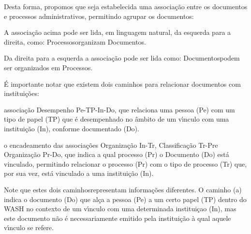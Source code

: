 \documentclass[
12pt,		%
openright,	%
twoside,  %
a4paper,			%
chapter=TITLE,		%
english,			%
french,				%
spanish,			%
brazil				%
]{USPSC-classe/USPSC}
\begin{document}
Desta forma, propomos que seja estabelecida uma associa\c{c}\~ao entre os documentos e processos administrativos, permitindo agrupar os documentos:






A associa\c{c}\~ao acima pode ser lida, em linguagem natural, da esquerda para a direita, como: \textquotedbl Processos\textquotedbl  organizam \textquotedbl Documentos\textquotedbl .




Da direita para a esquerda a associa\c{c}\~ao pode ser lida como: \textquotedbl Documentos\textquotedbl  podem ser organizados em \textquotedbl Processos\textquotedbl .




\'E importante notar que existem dois caminhos para relacionar documentos com institui\c{c}\~oes:





\begin{alineas}
\item associa\c{c}\~ao \textquotedbl Desempenho Pe-TP-In-Do\textquotedbl , que relaciona uma pessoa (Pe) com um tipo de papel (TP) que \'e desempenhado no \^ambito de um v\'{\i}nculo com uma institui\c{c}\~ao (In), conforme documentado 
(Do).
\item o encadeamento das associa\c{c}\~oes \textquotedbl Organiza\c{c}\~ao In-Tr\textquotedbl , \textquotedbl Classifica\c{c}\~ao Tr-Pr\textquotedbl  e \textquotedbl Organiza\c{c}\~ao Pr-Do\textquotedbl , que indica a qual processo (Pr) o Documento (Do) est\'a vinculado, permitindo relacionar o processo (Pr) com o tipo de processo (Tr) que, por sua vez, est\'a vinculado a uma institui\c{c}\~ao (In).
\end{alineas}

Note que estes dois \textquotedbl caminhos\textquotedbl  representam informa\c{c}\~oes diferentes. O caminho (a) indica o documento (Do) que al\c{c}a a pessoa (Pe) a um certo papel (TP) dentro do WASH no contexto de um v\'{\i}nculo com uma determinada institui\c{c}ao (In), mas este documento n\~ao \'e necessariamente emitido pela institui\c{c}\~ao \`a qual aquele v\'{\i}nculo se refere.
\end{document}
